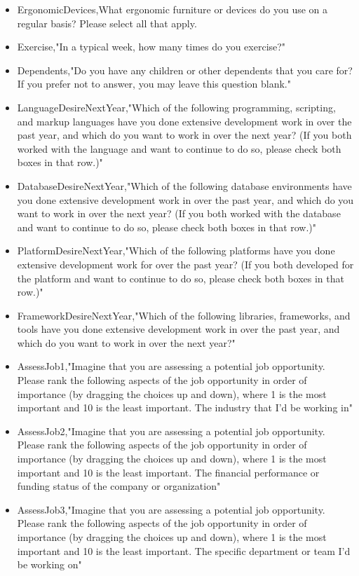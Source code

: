 \begin{appendices}
\begin{itemize}
        \item ErgonomicDevices,What ergonomic furniture or devices do you use on a regular basis? Please select all that apply.
        \item Exercise,"In a typical week, how many times do you exercise?"
        \item Dependents,"Do you have any children or other dependents that you care for? If you prefer not to answer, you may leave this question blank."
        \item LanguageDesireNextYear,"Which of the following programming, scripting, and markup languages have you done extensive development work in over the past year, and which do you want to work in over the next year?  (If you both worked with the language and want to continue to do so, please check both boxes in that row.)"
        \item DatabaseDesireNextYear,"Which of the following database environments have you done extensive development work in over the past year, and which do you want to work in over the next year?   (If you both worked with the database and want to continue to do so, please check both boxes in that row.)"
        \item PlatformDesireNextYear,"Which of the following platforms have you done extensive development work for over the past year?   (If you both developed for the platform and want to continue to do so, please check both boxes in that row.)"
        \item FrameworkDesireNextYear,"Which of the following libraries, frameworks, and tools have you done extensive development work in over the past year, and which do you want to work in over the next year?"
        \item AssessJob1,"Imagine that you are assessing a potential job opportunity. Please rank the following aspects of the job opportunity in order of importance (by dragging the choices up and down), where 1 is the most important and 10 is the least important. The industry that I'd be working in"
        \item AssessJob2,"Imagine that you are assessing a potential job opportunity. Please rank the following aspects of the job opportunity in order of importance (by dragging the choices up and down), where 1 is the most important and 10 is the least important. The financial performance or funding status of the company or organization"
        \item AssessJob3,"Imagine that you are assessing a potential job opportunity. Please rank the following aspects of the job opportunity in order of importance (by dragging the choices up and down), where 1 is the most important and 10 is the least important. The specific department or team I'd be working on"

\end{itemize}
\end{appendices}
